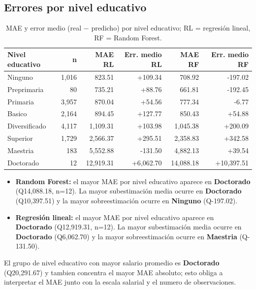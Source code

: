 \subsection{Errores por nivel educativo}
\begin{table}[htbp]\centering\footnotesize
\begin{tabular}{lrrrrr}\toprule
Nivel educativo & n & MAE RL & Err. medio RL & MAE RF & Err. medio RF \\ \midrule
Ninguno & 1,016 & 823.51 & +109.34 & 708.92 & -197.02 \\
Preprimaria & 80 & 735.21 & +88.76 & 661.81 & -192.45 \\
Primaria & 3,957 & 870.04 & +54.56 & 777.34 & -6.77 \\
Basico & 2,164 & 894.45 & +127.77 & 850.43 & +54.88 \\
Diversificado & 4,117 & 1,109.31 & +103.98 & 1,045.38 & +200.09 \\
Superior & 1,729 & 2,566.37 & +295.51 & 2,358.83 & +342.58 \\
Maestria & 183 & 5,552.88 & -131.50 & 4,882.13 & +39.54 \\
Doctorado & 12 & 12,919.31 & +6,062.70 & 14,088.18 & +10,397.51 \\
\bottomrule\end{tabular}
\caption{MAE y error medio (real $-$ predicho) por nivel educativo; RL = regresión lineal, RF = Random Forest.}
\end{table}
\begin{itemize}\setlength{\itemsep}{2pt}
\item \textbf{Random Forest:} el mayor MAE por nivel educativo aparece en \textbf{Doctorado} (Q14,088.18, n=12). La mayor subestimación media ocurre en \textbf{Doctorado} (Q10,397.51) y la mayor sobreestimación ocurre en \textbf{Ninguno} (Q-197.02).
\item \textbf{Regresión lineal:} el mayor MAE por nivel educativo aparece en \textbf{Doctorado} (Q12,919.31, n=12). La mayor subestimación media ocurre en \textbf{Doctorado} (Q6,062.70) y la mayor sobreestimación ocurre en \textbf{Maestria} (Q-131.50).
\end{itemize}

El grupo de nivel educativo con mayor salario promedio es \textbf{Doctorado} (Q20,291.67) y tambien concentra el mayor MAE absoluto; esto obliga a interpretar el MAE junto con la escala salarial y el numero de observaciones.

